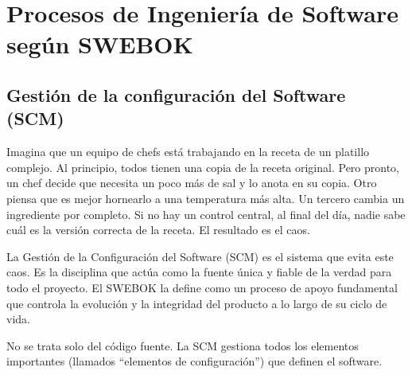 \chapter{Procesos de Ingeniería de Software según SWEBOK}

\section{Gestión de la configuración del Software (SCM)}
Imagina que un equipo de chefs está trabajando en la receta de un platillo complejo. 
Al principio, todos tienen una copia de la receta original. 
Pero pronto, un chef decide que necesita un poco más de sal y lo anota en su copia. 
Otro piensa que es mejor hornearlo a una temperatura más alta. 
Un tercero cambia un ingrediente por completo. 
Si no hay un control central, al final del día, nadie sabe cuál es la versión correcta de la receta. 
El resultado es el caos.

La Gestión de la Configuración del Software (SCM) es el sistema que evita este caos. 
Es la disciplina que actúa como la fuente única y fiable de la verdad para todo el proyecto. 
El SWEBOK la define como un proceso de apoyo fundamental que controla la evolución y la integridad del producto a lo largo de su ciclo de vida.

No se trata solo del código fuente. 
La SCM gestiona todos los elementos importantes (llamados ``elementos de configuración'') que definen el software.

